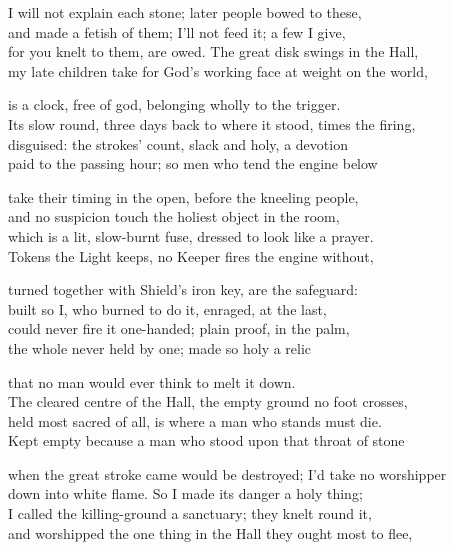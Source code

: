 \ornament


\begin{founder}
I will not explain each stone; later people bowed to these,\\
and made a fetish of them; I'll not feed it; a few I give,\\
for you knelt to them, are owed. The great disk swings in the Hall,\\
my late children take for God's working face at weight on the world,\\
\medskip

is a clock, free of god, belonging wholly to the trigger.\\
Its slow round, three days back to where it stood, times the firing,\\
disguised: the strokes' count, slack and holy, a devotion\\
paid to the passing hour; so men who tend the engine below\\
\medskip

take their timing in the open, before the kneeling people,\\
and no suspicion touch the holiest object in the room,\\
which is a lit, slow-burnt fuse, dressed to look like a prayer.\\
Tokens the Light keeps, no Keeper fires the engine without,\\
\medskip

turned together with Shield's iron key, are the safeguard:\\
built so I, who burned to do it, enraged, at the last,\\
could never fire it one-handed; plain proof, in the palm,\\
the whole never held by one; made so holy a relic\\
\medskip

that no man would ever think to melt it down.\\
The cleared centre of the Hall, the empty ground no foot crosses,\\
held most sacred of all, is where a man who stands must die.\\
Kept empty because a man who stood upon that throat of stone\\
\medskip

when the great stroke came would be destroyed; I'd take no worshipper\\
down into white flame. So I made its danger a holy thing;\\
I called the killing-ground a sanctuary; they knelt round it,\\
and worshipped the one thing in the Hall they ought most to flee,\\
\medskip


\end{founder}
